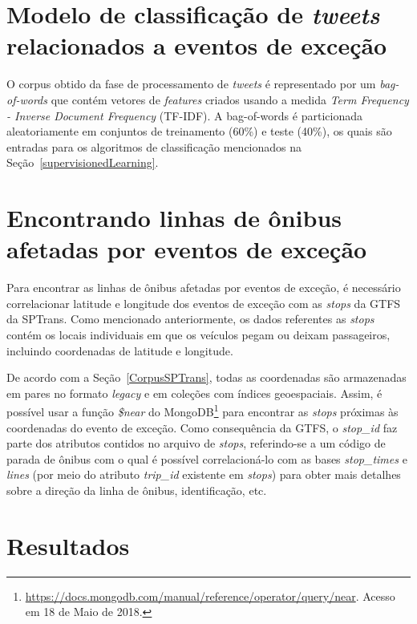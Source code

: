 \documentclass[
	12pt,				%
	oneside,			%
	a4paper,			%
	english,			%
	brazil				%
	]{abntex2ppgsi}
\begin{document}
{{\section{Modelo de classificação de \textit{tweets} relacionados a eventos de exceção}
\label{model}

O corpus obtido da fase de processamento de \textit {tweets} é representado por um \textit{bag-of-words} que contém vetores de \textit{features} criados usando a medida \textit{Term Frequency - Inverse Document Frequency} (TF-IDF). A bag-of-words é particionada aleatoriamente em conjuntos de treinamento (60\%) e teste (40\%), os quais são entradas para os algoritmos de classificação mencionados na Seção~\ref{supervisionedLearning}.

\section{Encontrando linhas de ônibus afetadas por eventos de exceção}

Para encontrar as linhas de ônibus afetadas por eventos de exceção, é necessário correlacionar latitude e longitude dos eventos de exceção com as \textit{stops} da GTFS da SPTrans. Como mencionado anteriormente, os dados referentes as \textit{stops} contém os locais individuais em que os veículos pegam ou deixam passageiros, incluindo coordenadas de latitude e longitude.

De acordo com a Seção~\ref{CorpusSPTrans}, todas as coordenadas são armazenadas em pares no formato \textit{legacy} e em coleções com índices geoespaciais. Assim, é possível usar a função \textit{\$near} do MongoDB\footnote {\url{https://docs.mongodb.com/manual/reference/operator/query/near}. Acesso em 18 de Maio de 2018.} para encontrar as \textit{stops} próximas às coordenadas do evento de exceção. Como consequência da GTFS, o \textit{stop\_id} faz parte dos atributos contidos no arquivo de \textit{stops}, referindo-se a um código de parada de ônibus com o qual é possível correlacioná-lo com as bases \textit{stop\_times} e \textit{lines} (por meio do atributo \textit{trip\_id} existente em \textit{stops}) para obter mais detalhes sobre a direção da linha de ônibus, identificação, etc.

\section{Resultados}
	
}}
\end{document}
